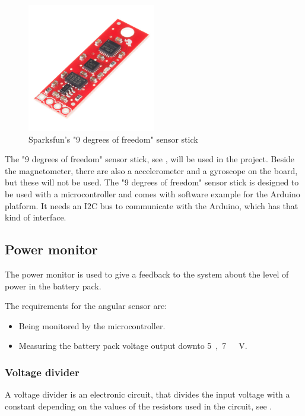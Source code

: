 \begin{figure}[H]
	\centering
	\includegraphics[width=0.50\textwidth]{figures/NineDegree.jpg}
		\caption{Sparksfun's "9 degrees of freedom" sensor stick} 
	\label{NineDegree}
\end{figure}

The "9 degrees of freedom" sensor stick, see , will be used in the project. Beside the magnetometer, there are also a accelerometer and a gyroscope on the board, but these will not be used. The "9 degrees of freedom" sensor stick is designed to be used with a microcontroller and comes with software example for the Arduino platform. It needs an I2C bus to communicate with the Arduino, which has that kind of interface.


\subsection{Power monitor}
The power monitor is used to give a feedback to the system about the level of power in the battery pack.

The requirements for the angular sensor are:
\begin{itemize}
\item Being monitored by the microcontroller.
\item Measuring the battery pack voltage output downto \si{5,7\ V}.
\end{itemize}

\subsubsection{Voltage divider}
A voltage divider is an electronic circuit, that divides the input voltage with a constant depending on the values of the resistors used in the circuit, see .

